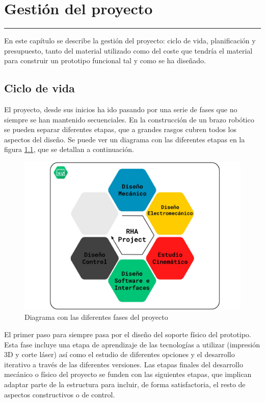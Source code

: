 \chapter{Gestión del proyecto} \label{chap:Gestion}
\hrule
\vspace{3mm}

En este capítulo se describe la gestión del proyecto: ciclo de vida, planificación y presupuesto, tanto del material utilizado como del coste que tendría el material para construir un prototipo funcional tal y como se ha diseñado.

\section{Ciclo de vida}

El proyecto, desde sus inicios ha ido pasando por una serie de fases que no siempre se han mantenido secuenciales. En la construcción de un brazo robótico se pueden separar diferentes etapas, que a grandes rasgos cubren todos los aspectos del diseño. Se puede ver un diagrama con las diferentes etapas en la figura \ref{fig:Gestion:fases_proyecto}, que se detallan a continuación.
\\

\begin{figure}
	\centering
	\includegraphics[width=1\textwidth]{figuras/Imagenes_Gestion/fases_proyecto.jpg}
	\caption{Diagrama con las diferentes fases del proyecto}
	\label{fig:Gestion:fases_proyecto}
\end{figure}


El primer paso para siempre pasa por el diseño del soporte físico del prototipo. Esta fase incluye una etapa de aprendizaje de las tecnologías a utilizar (impresión 3D y corte láser) así como el estudio de diferentes opciones y el desarrollo iterativo a través de las diferentes versiones. Las etapas finales del desarrollo mecánico o físico del proyecto se funden con las siguientes etapas, que implican adaptar parte de la estructura para incluir, de forma satisfactoria, el resto de aspectos constructivos o de control.
\\

